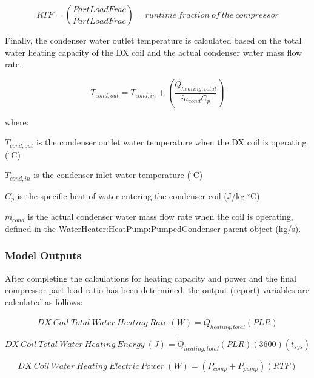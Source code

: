 \begin{equation}
RTF = \left( \frac{PartLoadFrac}{PartLoadFrac} \right) = runtime~fraction~of~the~compressor
\end{equation}

Finally, the condenser water outlet temperature is calculated based on the total water heating capacity of the DX coil and the actual condenser water mass flow rate.

\begin{equation}
{T_{cond,out}} = {T_{cond,in}} + \left( {\frac{\dot{Q}_{heating,total}}{{\dot{m}_{cond}}{C_p}}} \right)
\end{equation}

where:

\({T_{cond,out}}\) is the condenser outlet water temperature when the DX coil is operating (\(^{\circ}\)C)

\({T_{cond,in}}\) is the condenser inlet water temperature (\(^{\circ}\)C)

\({C_p}\) is the specific heat of water entering the condenser coil (J/kg-\(^{\circ}\)C)

\(\dot{m}_{cond}\) is the actual condenser water mass flow rate when the coil is operating, defined in the WaterHeater:HeatPump:PumpedCondenser parent object (kg/s).

\subsubsection{Model Outputs}\label{model-outputs-1}

After completing the calculations for heating capacity and power and the final compressor part load ratio has been determined, the output (report) variables are calculated as follows:

\begin{equation}
DX~Coil~Total~Water~Heating~Rate~(W) = {\dot{Q}_{heating,total}}\left( {PLR} \right)
\end{equation}

\begin{equation}
DX~Coil~Total~Water~Heating~Energy~(J) = {\dot{Q}_{heating,total}}\left( {PLR} \right)\left( {3600} \right)\left( {{t_{sys}}} \right)
\end{equation}

\begin{equation}
DX~Coil~Water~Heating~Electric~Power~(W) = \left( {{P_{comp}} + {P_{pump}}} \right)\left( {RTF} \right)
\end{equation}

